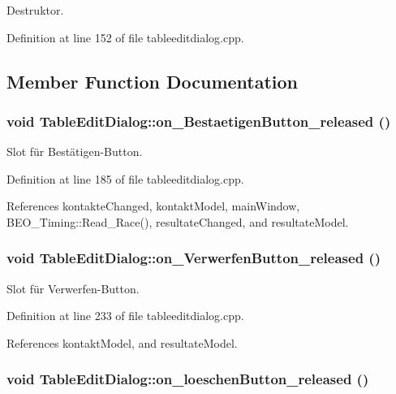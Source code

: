 Destruktor. 



Definition at line 152 of file tableeditdialog.cpp.

\subsection{Member Function Documentation}
\hypertarget{class_table_edit_dialog_b3ae208e0e028f4030875efe33e3de48}{
\subsubsection[on\_\-BestaetigenButton\_\-released]{\setlength{\rightskip}{0pt plus 5cm}void TableEditDialog::on\_\-BestaetigenButton\_\-released ()}}
\label{class_table_edit_dialog_b3ae208e0e028f4030875efe33e3de48}


Slot für Bestätigen-Button. 



Definition at line 185 of file tableeditdialog.cpp.

References kontakteChanged, kontaktModel, mainWindow, BEO\_\-Timing::Read\_\-Race(), resultateChanged, and resultateModel.\hypertarget{class_table_edit_dialog_d10a162c0554577a222a34cd918e3d1f}{
\subsubsection[on\_\-VerwerfenButton\_\-released]{\setlength{\rightskip}{0pt plus 5cm}void TableEditDialog::on\_\-VerwerfenButton\_\-released ()}}
\label{class_table_edit_dialog_d10a162c0554577a222a34cd918e3d1f}


Slot für Verwerfen-Button. 



Definition at line 233 of file tableeditdialog.cpp.

References kontaktModel, and resultateModel.\hypertarget{class_table_edit_dialog_0ccad25795df2d282741c21eeca778e6}{
\subsubsection[on\_\-loeschenButton\_\-released]{\setlength{\rightskip}{0pt plus 5cm}void TableEditDialog::on\_\-loeschenButton\_\-released ()}}
\label{class_table_edit_dialog_0ccad25795df2d282741c21eeca778e6}


